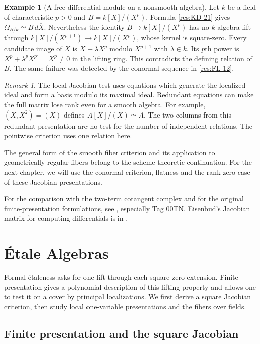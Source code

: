 \documentclass[11pt,oneside,openany]{book}
\theoremstyle{definition}
\newtheorem{example}[theorem]{Example}
\theoremstyle{remark}
\newtheorem{remark}[theorem]{Remark}
\begin{document}
\begin{example}[A free differential module on a nonsmooth algebra]
\label{res:SM-17}
Let $k$ be a field of characteristic $p>0$ and
$B=k[X]/(X^p)$. Formula \ref{res:KD-21} gives
$\Omega_{B/k}\simeq B\,d\overline X$. Nevertheless the
identity $B\to k[X]/(X^p)$ has no $k$-algebra lift through
$k[X]/(X^{p+1})\to k[X]/(X^p)$, whose kernel is square-zero.
Every candidate image of $\overline X$ is
$X+\lambda X^p$ modulo $X^{p+1}$ with $\lambda\in k$.
Its $p$th power is $X^p+\lambda^p X^{p^2}=X^p\ne0$ in
the lifting ring. This contradicts the defining relation
of $B$. The same failure was detected by the conormal
sequence in \ref{res:FL-12}.
\end{example}

\begin{remark}
The local Jacobian test uses equations which generate the
localized ideal and form a basis modulo its maximal ideal.
Redundant equations can make the full matrix lose rank even
for a smooth algebra. For example, $(X,X^2)=(X)$ defines
$A[X]/(X)\simeq A$. The two columns from this redundant
presentation are no test for the number of independent
relations. The pointwise criterion uses one relation here.
\end{remark}

The general form of the smooth fiber criterion and its
application to geometrically regular fibers belong to the
scheme-theoretic continuation. For the next chapter, we
will use the conormal criterion, flatness and the rank-zero
case of these Jacobian presentations.

For the comparison with the two-term cotangent complex
and for the original finite-presentation formulations,
see \cite[Sections 10.137 and 10.138]{stacks}, especially
\href{https://stacks.math.columbia.edu/tag/00TN}{Tag 00TN}.
Eisenbud's Jacobian matrix for computing differentials is
in \cite[Section 16.1]{eisenbud}.
\chapter{\'Etale Algebras}\label{ch:etale}

Formal \'{e}taleness asks for one lift through each square-zero extension.
Finite presentation gives a polynomial description of this lifting property
and allows one to test it on a cover by principal localizations. We first
derive a square Jacobian criterion, then study local one-variable
presentations and the fibers over fields.

\section{Finite presentation and the square Jacobian}
\end{document}
